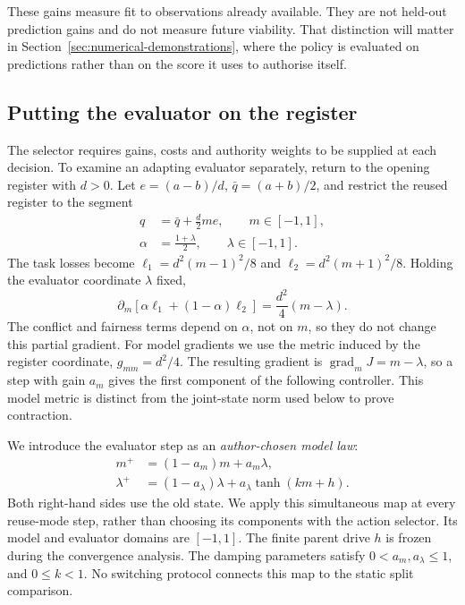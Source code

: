 These gains measure fit to observations already available. They are not held-out prediction gains and do not measure future viability. That distinction will matter in Section~\ref{sec:numerical-demonstrations}, where the policy is evaluated on predictions rather than on the score it uses to authorise itself.

\subsection{Putting the evaluator on the register}

The selector requires gains, costs and authority weights to be supplied at each decision. To examine an adapting evaluator separately, return to the opening register with \(d>0\). Let
\(e=(a-b)/d\), \(\bar q=(a+b)/2\), and restrict the reused register to the segment
\begin{align}
 q&=\bar q+\frac d2 m e,\qquad m\in[-1,1],\nonumber\\
 \alpha&=\frac{1+\lambda}{2},\qquad\lambda\in[-1,1].
 \label{eq:register-coordinate}
\end{align}
The task losses become
\(\ell_1=d^2(m-1)^2/8\) and
\(\ell_2=d^2(m+1)^2/8\).
Holding the evaluator coordinate \(\lambda\) fixed,
\begin{equation}
 \partial_m[\alpha\ell_1+(1-\alpha)\ell_2]
                  =\frac{d^2}{4}(m-\lambda).
 \label{eq:register-gradient}
\end{equation}
The conflict and fairness terms depend on \(\alpha\), not on \(m\), so they do not change this partial gradient. For model gradients we use the metric induced by the register coordinate, \(g_{mm}=d^2/4\). The resulting gradient is \(\operatorname{grad}_m J=m-\lambda\), so a step with gain \(a_m\) gives the first component of the following controller. This model metric is distinct from the joint-state norm used below to prove contraction.

We introduce the evaluator step as an \emph{author-chosen model law}:
\begin{align}
 m^+&=(1-a_m)m+a_m\lambda,\nonumber\\
 \lambda^+&=(1-a_\lambda)\lambda+
                      a_\lambda\tanh(km+h).
 \label{eq:regulator}
\end{align}
Both right-hand sides use the old state. We apply this simultaneous map at every reuse-mode step, rather than choosing its components with the action selector. Its model and evaluator domains are \([-1,1]\). The finite parent drive \(h\) is frozen during the convergence analysis. The damping parameters satisfy \(0<a_m,a_\lambda\leq1\), and \(0\leq k<1\). No switching protocol connects this map to the static split comparison.

